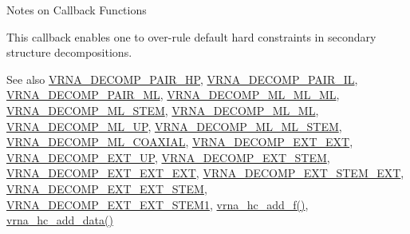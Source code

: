 \begin{DoxyRefDesc}{Notes on Callback Functions}
\item[\mbox{\hyperlink{callbacks__callbacks000013}{Notes on Callback Functions}}]This callback enables one to over-\/rule default hard constraints in secondary structure decompositions. \end{DoxyRefDesc}


\begin{DoxySeeAlso}{See also}
\mbox{\hyperlink{group__constraints_ga8bd41ebc8039378d242e4e8c273716a5}{V\+R\+N\+A\+\_\+\+D\+E\+C\+O\+M\+P\+\_\+\+P\+A\+I\+R\+\_\+\+HP}}, \mbox{\hyperlink{group__constraints_gaeab04f34d7730cff2d651d782f95d857}{V\+R\+N\+A\+\_\+\+D\+E\+C\+O\+M\+P\+\_\+\+P\+A\+I\+R\+\_\+\+IL}}, \mbox{\hyperlink{group__constraints_gaa15b1185673f0b9e900c4748d45f388f}{V\+R\+N\+A\+\_\+\+D\+E\+C\+O\+M\+P\+\_\+\+P\+A\+I\+R\+\_\+\+ML}}, \mbox{\hyperlink{group__constraints_ga735517266f2e35e1374b8f1ea77ef23e}{V\+R\+N\+A\+\_\+\+D\+E\+C\+O\+M\+P\+\_\+\+M\+L\+\_\+\+M\+L\+\_\+\+ML}}, \mbox{\hyperlink{group__constraints_ga4a23054c75d8efc785de50e3ea87602f}{V\+R\+N\+A\+\_\+\+D\+E\+C\+O\+M\+P\+\_\+\+M\+L\+\_\+\+S\+T\+EM}}, \mbox{\hyperlink{group__constraints_ga7f4cb9ff7a33e67f0539bd39e7b19a78}{V\+R\+N\+A\+\_\+\+D\+E\+C\+O\+M\+P\+\_\+\+M\+L\+\_\+\+ML}}, \mbox{\hyperlink{group__constraints_gae6478dda14e50e2f2cb9ef333a29256e}{V\+R\+N\+A\+\_\+\+D\+E\+C\+O\+M\+P\+\_\+\+M\+L\+\_\+\+UP}}, \mbox{\hyperlink{group__constraints_ga63d8ceb8c96ae3b463e529e28cc0fe98}{V\+R\+N\+A\+\_\+\+D\+E\+C\+O\+M\+P\+\_\+\+M\+L\+\_\+\+M\+L\+\_\+\+S\+T\+EM}}, \mbox{\hyperlink{group__constraints_ga4fe48d575830b16c208e280e01ab1497}{V\+R\+N\+A\+\_\+\+D\+E\+C\+O\+M\+P\+\_\+\+M\+L\+\_\+\+C\+O\+A\+X\+I\+AL}}, \mbox{\hyperlink{group__constraints_ga437adf5115c1999304eff26b41e4c9b6}{V\+R\+N\+A\+\_\+\+D\+E\+C\+O\+M\+P\+\_\+\+E\+X\+T\+\_\+\+E\+XT}}, \mbox{\hyperlink{group__constraints_gaff1ddaffe86d984623910b40cc8a8717}{V\+R\+N\+A\+\_\+\+D\+E\+C\+O\+M\+P\+\_\+\+E\+X\+T\+\_\+\+UP}}, \mbox{\hyperlink{group__constraints_gae44b5ace0d9b4a29088069ecb4cec441}{V\+R\+N\+A\+\_\+\+D\+E\+C\+O\+M\+P\+\_\+\+E\+X\+T\+\_\+\+S\+T\+EM}}, \mbox{\hyperlink{group__constraints_ga803bd818b3f4b2b0a4a5cfa2f7dc2045}{V\+R\+N\+A\+\_\+\+D\+E\+C\+O\+M\+P\+\_\+\+E\+X\+T\+\_\+\+E\+X\+T\+\_\+\+E\+XT}}, \mbox{\hyperlink{group__constraints_gabb09c5b78b75a44502fc77b950125c1e}{V\+R\+N\+A\+\_\+\+D\+E\+C\+O\+M\+P\+\_\+\+E\+X\+T\+\_\+\+S\+T\+E\+M\+\_\+\+E\+XT}}, \mbox{\hyperlink{group__constraints_ga06efd054c9271438f6d82d4559d9e69f}{V\+R\+N\+A\+\_\+\+D\+E\+C\+O\+M\+P\+\_\+\+E\+X\+T\+\_\+\+E\+X\+T\+\_\+\+S\+T\+EM}}, \mbox{\hyperlink{group__constraints_ga2e75d7a77118735b32f25422d9686719}{V\+R\+N\+A\+\_\+\+D\+E\+C\+O\+M\+P\+\_\+\+E\+X\+T\+\_\+\+E\+X\+T\+\_\+\+S\+T\+E\+M1}}, \mbox{\hyperlink{hard_8h_af220427ba7ecc8e786a07b7799658f18}{vrna\+\_\+hc\+\_\+add\+\_\+f()}}, \mbox{\hyperlink{hard_8h_a128920e0af52e4196a9d59fa13336c7c}{vrna\+\_\+hc\+\_\+add\+\_\+data()}}
\end{DoxySeeAlso}

